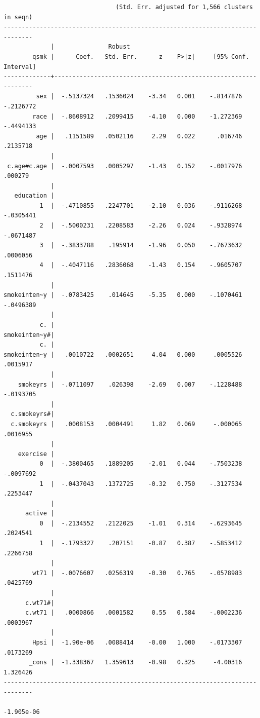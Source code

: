 \documentclass[
  10pt,
]{book}
\begin{document}
\begin{verbatim}
                               (Std. Err. adjusted for 1,566 clusters in seqn)
------------------------------------------------------------------------------
             |               Robust
        qsmk |      Coef.   Std. Err.      z    P>|z|     [95% Conf. Interval]
-------------+----------------------------------------------------------------
         sex |  -.5137324   .1536024    -3.34   0.001    -.8147876   -.2126772
        race |  -.8608912   .2099415    -4.10   0.000    -1.272369   -.4494133
         age |   .1151589   .0502116     2.29   0.022      .016746    .2135718
             |
 c.age#c.age |  -.0007593   .0005297    -1.43   0.152    -.0017976     .000279
             |
   education |
          1  |  -.4710855   .2247701    -2.10   0.036    -.9116268   -.0305441
          2  |  -.5000231   .2208583    -2.26   0.024    -.9328974   -.0671487
          3  |  -.3833788    .195914    -1.96   0.050    -.7673632    .0006056
          4  |  -.4047116   .2836068    -1.43   0.154    -.9605707    .1511476
             |
smokeinten~y |  -.0783425    .014645    -5.35   0.000    -.1070461   -.0496389
             |
          c. |
smokeinten~y#|
          c. |
smokeinten~y |   .0010722   .0002651     4.04   0.000     .0005526    .0015917
             |
    smokeyrs |  -.0711097    .026398    -2.69   0.007    -.1228488   -.0193705
             |
  c.smokeyrs#|
  c.smokeyrs |   .0008153   .0004491     1.82   0.069     -.000065    .0016955
             |
    exercise |
          0  |  -.3800465   .1889205    -2.01   0.044    -.7503238   -.0097692
          1  |  -.0437043   .1372725    -0.32   0.750    -.3127534    .2253447
             |
      active |
          0  |  -.2134552   .2122025    -1.01   0.314    -.6293645    .2024541
          1  |  -.1793327    .207151    -0.87   0.387    -.5853412    .2266758
             |
        wt71 |  -.0076607   .0256319    -0.30   0.765    -.0578983    .0425769
             |
      c.wt71#|
      c.wt71 |   .0000866   .0001582     0.55   0.584    -.0002236    .0003967
             |
        Hpsi |  -1.90e-06   .0088414    -0.00   1.000    -.0173307    .0173269
       _cons |  -1.338367   1.359613    -0.98   0.325     -4.00316    1.326426
------------------------------------------------------------------------------

-1.905e-06











\end{verbatim}
\end{document}
